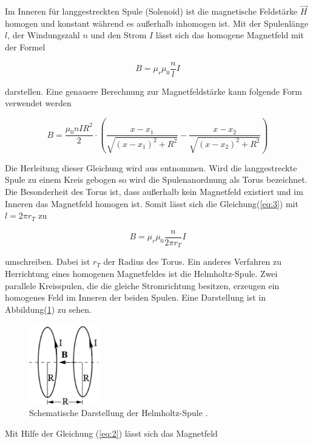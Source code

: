 Im Inneren für langgestreckten Spule (Solenoid) ist die magnetische Feldstärke $\vec{H}$
homogen und konstant während es außerhalb inhomogen ist.
Mit der Spulenlänge $l$, der Windungszahl $n$ und den Strom $I$ lässt sich das
homogene Magnetfeld mit der Formel

\begin{equation}
  B = \mu_r \mu_0 \frac{n}{l} I
  \label{eq:3}
\end{equation}

darstellen.
Eine genauere Berechnung zur Magnetfeldstärke kann folgende Form verwendet werden

\begin{equation}
  B= \frac{\mu_0 n I R^2}{2} \cdot (\frac{x-x_1}{\sqrt{(x-x_1)^2 +R^2}} - \frac{x-x_2}{\sqrt{(x-x_2)^2 +R^2}})
  \label{eq:7}
\end{equation}

Die Herleitung dieser Gleichung wird aus \cite{2} entnommen.
Wird die langgestreckte Spule zu einem Kreis gebogen so wird die Spulenanordnung
als Torus bezeichnet. Die Besonderheit des Torus ist, dass außerhalb kein Magnetfeld
existiert und im Inneren das Magnetfeld homogen ist. Somit lässt sich die Gleichung(\ref{eq:3})
mit $l= 2\pi r_T$ zu

\begin{equation}
  B = \mu_r \mu_0 \frac{n}{2\pi r_T} I
  \label{eq:4}
\end{equation}

umschreiben. Dabei ist $r_T$ der Radius des Torus.
Ein anderes Verfahren zu Herrichtung eines homogenen Magnetfeldes ist die Helmholtz-Spule.
Zwei parallele Kreisspulen, die die gleiche Stromrichtung besitzen, erzeugen ein homogenes
Feld im Inneren der beiden Spulen. Eine Darstellung ist in Abbildung(\ref{abb:2}) zu sehen.

\begin{figure}[H]
  \centering
\includegraphics[width =5 cm, height = 3.5cm]{Abb2.png}
\caption{Schematische Darstellung der Helmholtz-Spule \cite{1}.}
\label{abb:2}
\end{figure}

Mit Hilfe der Gleichung (\ref{eq:2}) lässt sich das Magnetfeld

